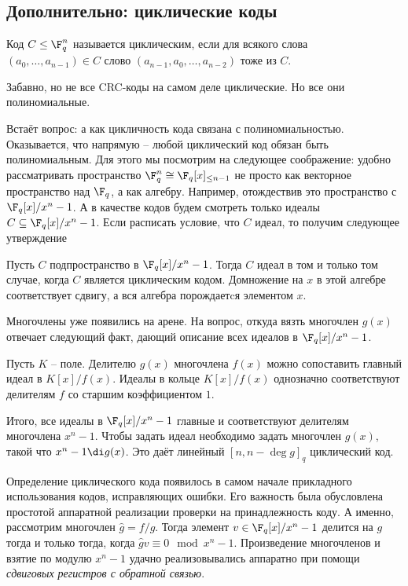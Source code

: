 \subsection{Дополнительно:  циклические коды}

\dfn Код $C\leq \F_q^n$ называется циклическим, если для всякого слова $(a_0,\dots,a_{n-1})\in C$ слово $(a_{n-1},a_0,\dots,a_{n-2})$ тоже из $C$. 
\edfn

\rm Забавно, но не все CRC-коды на самом деле циклические. Но все они полиномиальные.
\erm


Встаёт вопрос: а как цикличность кода связана с полиномиальностью. Оказывается, что напрямую -- любой циклический код обязан быть полиномиальным. Для этого мы посмотрим на следующее соображение: удобно рассматривать пространство $\F_q^n \cong \F_q[x]_{\leq n-1}$ не просто как векторное пространство над $\F_q$, а как алгебру. Например, отождествив это пространство с $\F_q[x]/x^n-1$. А в качестве кодов будем смотреть только идеалы $C \subseteq \F_q[x]/x^n-1$. Если расписать условие, что $C$ идеал, то получим следующее утверждение

\thrm Пусть $C$ подпространство в $\F_q[x]/x^n-1$. Тогда $C$ идеал в том и только том случае, когда $C$ является циклическим кодом.
\ethrm
\proof Домножение на $x$ в этой алгебре соответствует сдвигу, а вся алгебра порождаетcя элементом $x$.
\endproof

Многочлены уже появились на арене. На вопрос, откуда вязть многочлен $g(x)$ отвечает следующий факт, дающий описание всех идеалов в $\F_q[x]/x^n-1$.

\fct Пусть $K$ -- поле. Делителю $g(x)$ многочлена $f(x)$ можно сопоставить главный идеал в $K[x]/f(x)$. Идеалы в кольце $K[x]/f(x)$ однозначно соответствуют делителям $f$ со старшим коэффициентом $1$.
\efct

Итого, все идеалы в $\F_q[x]/x^n-1$ главные и соответствуют делителям многочлена $x^n-1$. Чтобы задать идеал необходимо задать многочлен $g(x)$, такой что $ x^n-1 \di g(x)$. Это даёт линейный $[n, n-\deg g]_q$ циклический код.

Определение циклического кода появилось в самом начале прикладного использования кодов, исправляющих ошибки. Его важность была обусловлена простотой аппаратной реализации проверки на принадлежность коду. А именно, рассмотрим многочлен $\hat{g}=f/g$. Тогда элемент $v \in \F_q[x]/x^n-1$ делится на $g$ тогда и только тогда, когда $\hat g v \equiv 0 \mod x^n-1$. 
Произведение многочленов и взятие по модулю $x^n-1$ удачно реализовывались аппаратно при помощи {\it сдвиговых регистров с обратной связью}.



